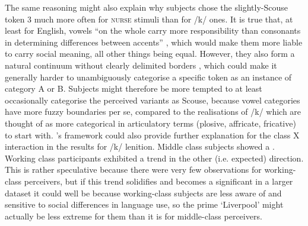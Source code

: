 The same reasoning might also explain why subjects chose the slightly-Scouse token 3 much more often for \textsc{nurse} stimuli than for /k/ ones.
It is true that, at least for English, vowels ``on the whole carry more responsibility than consonants in determining differences between accents'' \parencite[12]{foulkesdocherty1999a}, which would make them more liable to carry social meaning, all other things being equal.
However, they also form a natural continuum without clearly delimited borders \parencite[cf.][12]{foulkesdocherty1999a}, which could make it generally harder to unambiguously categorise a specific token as an instance of category A or B.
Subjects might therefore be more tempted to at least occasionally categorise the perceived variants as Scouse, because vowel categories have more fuzzy boundaries per se, compared to the realisations of /k/ which are thought of as more categorical in articulatory terms (plosive, affricate, fricative) to start with.
\citeauthor{herr1986}'s framework could also provide further explanation for the class X  interaction in the results for /k/ lenition.
Middle class subjects showed a .
Working class participants exhibited a trend in the other (i.e. expected) direction.
This is rather speculative because there were very few observations for working-class perceivers, but if this trend solidifies and becomes a significant  in a larger dataset it could well be because working-class subjects are less aware of and sensitive to social differences in language use, so the prime `Liverpool' might actually be less extreme for them than it is for middle-class perceivers.

